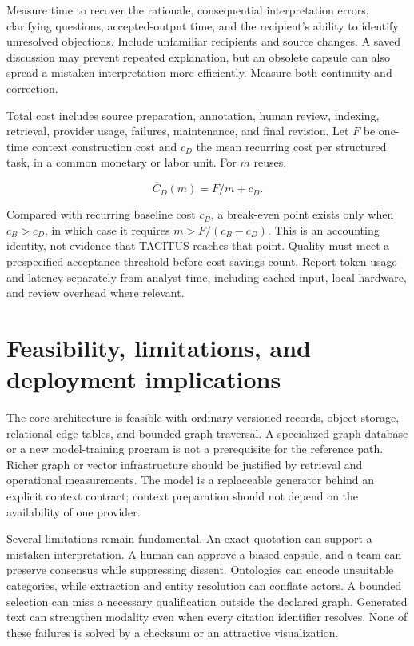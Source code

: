 \documentclass[
  11pt,
]{article}
\let\originalsection\section
\renewcommand{\section}{\Needspace{5\baselineskip}\originalsection}
\begin{document}
Measure time to recover the rationale, consequential interpretation
errors, clarifying questions, accepted-output time, and the recipient's
ability to identify unresolved objections. Include unfamiliar recipients
and source changes. A saved discussion may prevent repeated explanation,
but an obsolete capsule can also spread a mistaken interpretation more
efficiently. Measure both continuity and correction.

Total cost includes source preparation, annotation, human review,
indexing, retrieval, provider usage, failures, maintenance, and final
revision. Let \(F\) be one-time context construction cost and \(c_D\)
the mean recurring cost per structured task, in a common monetary or
labor unit. For \(m\) reuses,

\[
\overline{C}_D(m)=F/m+c_D.
\]

Compared with recurring baseline cost \(c_B\), a break-even point exists
only when \(c_B>c_D\), in which case it requires \(m>F/(c_B-c_D)\). This
is an accounting identity, not evidence that TACITUS reaches that point.
Quality must meet a prespecified acceptance threshold before cost
savings count. Report token usage and latency separately from analyst
time, including cached input, local hardware, and review overhead where
relevant.

\section{Feasibility, limitations, and deployment
implications}\label{feasibility-limitations-and-deployment-implications}

The core architecture is feasible with ordinary versioned records,
object storage, relational edge tables, and bounded graph traversal. A
specialized graph database or a new model-training program is not a
prerequisite for the reference path. Richer graph or vector
infrastructure should be justified by retrieval and operational
measurements. The model is a replaceable generator behind an explicit
context contract; context preparation should not depend on the
availability of one provider.

Several limitations remain fundamental. An exact quotation can support a
mistaken interpretation. A human can approve a biased capsule, and a
team can preserve consensus while suppressing dissent. Ontologies can
encode unsuitable categories, while extraction and entity resolution can
conflate actors. A bounded selection can miss a necessary qualification
outside the declared graph. Generated text can strengthen modality even
when every citation identifier resolves. None of these failures is
solved by a checksum or an attractive visualization.
\end{document}
